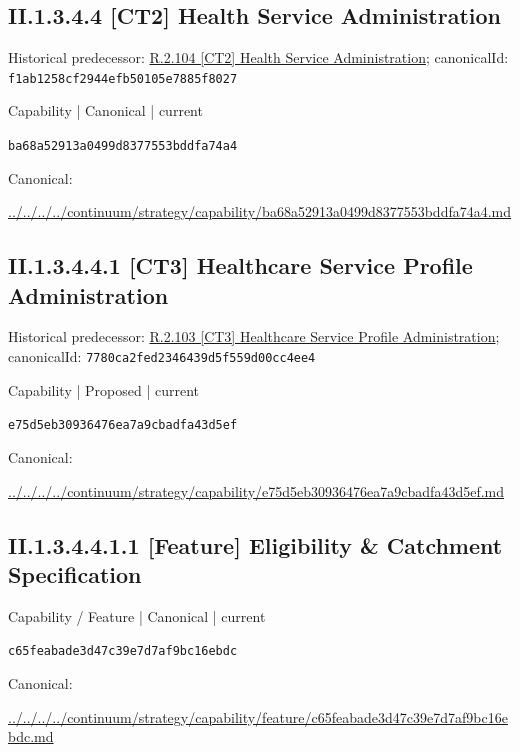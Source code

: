 \documentclass[10pt,a4paper]{article}
\begin{document}
\subsection*{II.1.3.4.4 [CT2] Health Service Administration}
Historical predecessor: \hyperref[element-f1ab1258cf2944efb50105e7885f8027]{R.2.104 [CT2] Health Service Administration}; canonicalId: \texttt{f1ab1258cf2944efb50105e7885f8027}\par
\label{element-ba68a52913a0499d8377553bddfa74a4}
{\small Capability | Canonical | current}\par
\texttt{ba68a52913a0499d8377553bddfa74a4}\par
Canonical: \par
{\footnotesize\url{../../../../continuum/strategy/capability/ba68a52913a0499d8377553bddfa74a4.md}}\par
\subsection*{II.1.3.4.4.1 [CT3] Healthcare Service Profile Administration}
Historical predecessor: \hyperref[element-7780ca2fed2346439d5f559d00cc4ee4]{R.2.103 [CT3] Healthcare Service Profile Administration}; canonicalId: \texttt{7780ca2fed2346439d5f559d00cc4ee4}\par
\label{element-e75d5eb30936476ea7a9cbadfa43d5ef}
{\small Capability | Proposed | current}\par
\texttt{e75d5eb30936476ea7a9cbadfa43d5ef}\par
Canonical: \par
{\footnotesize\url{../../../../continuum/strategy/capability/e75d5eb30936476ea7a9cbadfa43d5ef.md}}\par
\subsection*{II.1.3.4.4.1.1 [Feature] Eligibility \& Catchment Specification}
\label{element-c65feabade3d47c39e7d7af9bc16ebdc}
{\small Capability / Feature | Canonical | current}\par
\texttt{c65feabade3d47c39e7d7af9bc16ebdc}\par
Canonical: \par
{\footnotesize\url{../../../../continuum/strategy/capability/feature/c65feabade3d47c39e7d7af9bc16ebdc.md}}\par
\end{document}
